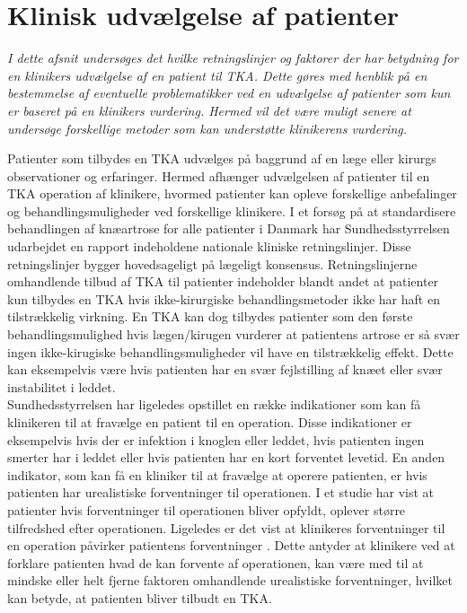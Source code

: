 \section{Klinisk udvælgelse af patienter}
\textit{I dette afsnit undersøges det hvilke retningslinjer og faktorer der har betydning for en klinikers udvælgelse af en patient til TKA. Dette gøres med henblik på en bestemmelse af eventuelle problematikker ved en udvælgelse af patienter som kun er baseret på en klinikers vurdering. Hermed vil det være muligt senere at undersøge forskellige metoder som kan understøtte klinikerens vurdering.}

Patienter som tilbydes en TKA udvælges på baggrund af en læge eller kirurgs observationer og erfaringer.
 Hermed afhænger udvælgelsen af patienter til en TKA operation af klinikere, hvormed patienter kan opleve forskellige anbefalinger og behandlingsmuligheder ved forskellige klinikere.  I et forsøg på at standardisere behandlingen af knæartrose for alle patienter i Danmark har Sundhedsstyrrelsen udarbejdet en rapport indeholdene nationale kliniske retningslinjer. Disse retningslinjer bygger hovedsageligt på lægeligt konsensus. Retningslinjerne omhandlende tilbud af TKA til patienter indeholder blandt andet at patienter kun tilbydes en TKA hvis ikke-kirurgiske behandlingsmetoder ikke har haft en tilstrækkelig virkning. En TKA kan dog tilbydes patienter som den første behandlingsmulighed hvis lægen/kirugen vurderer at patientens artrose er så svær ingen ikke-kirugiske behandlingsmuligheder vil have en tilstrækkelig effekt. Dette kan eksempelvis være hvis patienten har en svær fejlstilling af knæet eller svær instabilitet i leddet. \citep{brostrom2012} \\
Sundhedsstyrrelsen har ligeledes opstillet en række indikationer som kan få klinikeren til at fravælge en patient til en operation. Disse indikationer er eksempelvis hvis der er infektion i knoglen eller leddet, hvis patienten ingen smerter har i leddet eller hvis patienten har en kort forventet levetid. En anden indikator, som kan få en kliniker til at fravælge at operere patienten, er hvis patienten har urealistiske forventninger til operationen. \citep{brostrom2012} I et studie har \cite{tejada2010} vist at patienter hvis forventninger til operationen bliver opfyldt, oplever større tilfredshed efter operationen. Ligeledes er det vist at klinikeres forventninger til en operation påvirker patientens forventninger \citep{tejada2010}. Dette antyder at klinikere ved at forklare patienten hvad de kan forvente af operationen, kan være med til at mindske eller helt fjerne faktoren omhandlende urealistiske forventninger, hvilket kan betyde, at patienten bliver tilbudt en TKA. \\
